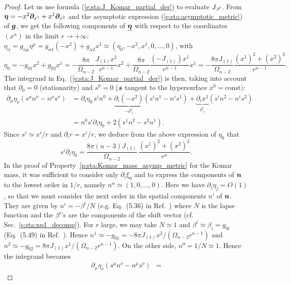 \begin{proof}
Let us use formula (\ref{e:sta:J_Komar_partial_der}) to evaluate
$J_{\mathscr{S}}$.
From $\bm{\eta} = - x^2 \bm{\partial}_{x^1} + x^1 \bm{\partial}_{x^2}$ and the asymptotic
expression (\ref{e:sta:asymptotic_metric}) of $\bm{g}$, we get the following
components of $\underline{\bm{\eta}}$ with respect to the coordinates $(x^\alpha)$
in the limit $r\to +\infty$:
$\eta_\alpha = g_{\alpha\mu} \eta^\mu = g_{\alpha 1} (-x^2) + g_{\alpha 2} x^1
\simeq (\eta_0, -x^2, x^1, 0, \ldots, 0)$, with
\[
    \eta_0 = - g_{01} x^2 + g_{02} x^1 = - \frac{8\pi}{\Omega_{n-2}} \frac{J_{(1)} x^2}{r^{n-1}} x^2
    + \frac{8\pi}{\Omega_{n-2}} \frac{(-J_{(1)}) x^1}{r^{n-1}} x^1
    = - \frac{8\pi J_{(1)}}{\Omega_{n-2}} \frac{(x^1)^2 + (x^2)^2}{r^{n-1}} .
\]
The integrand in Eq.~(\ref{e:sta:J_Komar_partial_der}) is then, taking into account that $\partial_0 = 0$
(stationarity) and $s^0 = 0$ ($\bm{s}$ tangent to the hypersurface $x^0 = \mathrm{const})$:
\begin{align}
\partial_\mu \eta_\nu (s^\mu n^\nu - n^\mu s^\nu)
  & = \partial_i \eta_0 \, s^i n^0 + \underbrace{\partial_i(-x^2)}_{-\delta^2_{\ \, i}} (s^i n^1 - n^i s^1)
    +  \underbrace{\partial_i x^1}_{\delta^1_{\ \, i}}(s^i n^2 - n^i s^2) \nonumber \\
 & = n^0 s^i \partial_i \eta_0  + 2 (s^1 n^2 - s^2 n^1) . \nonumber
\end{align}
Since $s^i \simeq x^i / r$ and $\partial_i r = x^i / r$,
we deduce from the above expression of $\eta_0$ that
\[
    s^i \partial_i \eta_0 = \frac{8\pi (n-3) J_{(1)}}{\Omega_{n-2}} \, \frac{(x^1)^2 + (x^2)^2}{r^n} .
\]
In the proof of Property~\ref{p:sta:Komar_mass_asymp_metric} for the Komar mass,
it was sufficient to consider only
$\partial_i\xi_0$ and to express the components of $\bm{n}$ to the lowest order in
$1/r$, namely $n^\alpha \simeq (1,0,\ldots,0)$. Here we have $\partial_i \eta_j = O(1)$,
so that we must consider the next order in the spatial components $n^i$ of
$\bm{n}$. They are given by $n^i = -\beta^i/N$ (e.g. Eq.~(5.36) in Ref.~\cite{Gourg12}) where $N$ is the lapse function and the $\beta^i$'s are the components of the shift vector
(cf. Sec.~\ref{s:sta:np1_decomp}).
For $r$ large, we may take $N\simeq 1$ and
$\beta^i \simeq \beta_i = g_{0i}$ (Eq.~(5.49) in Ref.~\cite{Gourg12}).
Hence $n^1 \simeq - g_{01} = - 8\pi J_{(1)} x^2 / (\Omega_{n-2} r^{n-1})$
and $n^2 \simeq - g_{02} = 8\pi J_{(1)} x^1 / (\Omega_{n-2} r^{n-1})$.
On the other side, $n^0 = 1/N \simeq 1$. Hence
the integrand becomes
\begin{align}
  \partial_\mu \eta_\nu (s^\mu n^\nu - n^\mu s^\nu) & =

\end{align}
\end{proof}
